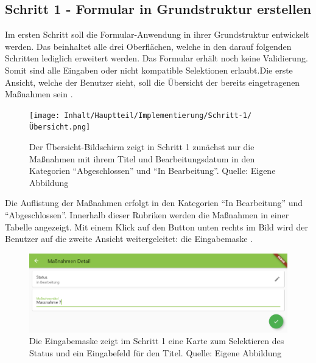 \subsection{Schritt 1 - Formular in Grundstruktur erstellen}

Im ersten Schritt soll die Formular-Anwendung in ihrer Grundstruktur entwickelt werden.  Das beinhaltet alle drei Oberflächen, welche in den darauf folgenden Schritten lediglich erweitert werden.  Das Formular erhält noch keine  Validierung. Somit sind alle Eingaben oder nicht kompatible Selektionen erlaubt.Die erste Ansicht, welche der Benutzer sieht, soll die Übersicht der bereits eingetragenen Maßnahmen sein \Abb{\ref{fig:Schritt1Uebersicht}}.

\begin{figure}[H]
  \centering
  \texttt{[image: Inhalt/Hauptteil/Implementierung/Schritt-1/Übersicht.png]}
  \caption[Schritt 1 Übersicht]{Der Übersicht-Bildschirm zeigt in  Schritt 1 zunächst nur die Maßnahmen mit ihrem Titel und Bearbeitungsdatum in den Kategorien \enquote{Abgeschlossen} und \enquote{In Bearbeitung}. Quelle: Eigene Abbildung}
  \label{fig:Schritt1Uebersicht}
\end{figure}
Die Auflistung der Maßnahmen erfolgt in den Kategorien \enquote{In Bearbeitung} und \enquote{Abgeschlossen}. Innerhalb dieser Rubriken werden die Maßnahmen in einer Tabelle angezeigt. Mit einem Klick auf den Button unten rechts im Bild wird der Benutzer auf die zweite Ansicht weitergeleitet: die Eingabemaske \Abb{\ref{fig:Schritt1Eingabemaske}}.
\begin{figure}[H]
  \centering
  \includegraphics[width=1.0\textwidth]{Inhalt/Hauptteil/Implementierung/Schritt-1/Eingabemaske.png}
  \caption[Schritt 1 Eingabemaske]{Die Eingabemaske zeigt im Schritt 1 eine Karte zum Selektieren des Status und ein Eingabefeld für den Titel. Quelle: Eigene Abbildung}
  \label{fig:Schritt1Eingabemaske}
\end{figure}
